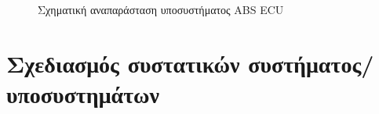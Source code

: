 \documentclass{article}
\begin{document}
\begin{figure}[H]
\caption{Σχηματική αναπαράσταση υποσυστήματος ABS ECU}
\label{fig:sensors-module}
\end{figure}


\section{Σχεδιασμός συστατικών συστήματος/υποσυστημάτων}
\end{document}
